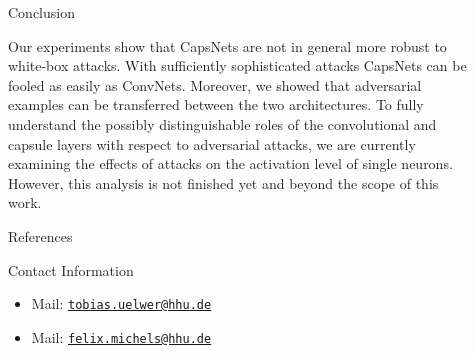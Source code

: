 \documentclass[final]{beamer}
\newlength{\sepwid}
\newlength{\onecolwid}
\newlength{\twocolwid}
\begin{document}
\begin{frame}[t]
\begin{columns}[t]
\begin{column}{\twocolwid}
		\end{column} 
		
		\begin{column}{\sepwid}\end{column} %
		
		\begin{column}{\onecolwid} %
			
			\begin{block}{Conclusion}
				
				Our experiments show that CapsNets are not in general more robust to
				white-box attacks. With sufficiently sophisticated attacks CapsNets
				can be fooled as easily as ConvNets.  Moreover, we showed that adversarial examples can be transferred between the two architectures. To fully understand the possibly distinguishable roles of the convolutional and capsule layers with respect to adversarial attacks, we are currently examining the effects of attacks on the activation level of single neurons.  However, this analysis is not finished yet and beyond the scope of this work.
				
			\end{block}
			
			\begin{block}{References}
				
				\tiny{
					\vspace{0.75in}}
				
			\end{block}
			
			
			
			\begin{alertblock}{Contact Information}
				
				\begin{itemize}
					\item Mail: \texttt{\href{mailto:tobias.uelwer@hhu.de}{tobias.uelwer@hhu.de}  }
					\item Mail: \texttt{\href{mailto:felix.michels@hhu.de}{felix.michels@hhu.de}}
				\end{itemize}
				

\end{alertblock}
\end{column}
\end{columns}
\end{frame}
\end{document}
